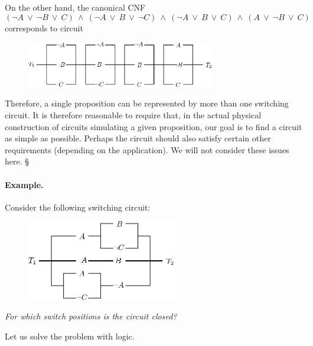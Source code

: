 \documentclass[11pt,paper=b5,footinclude,headinclude]{scrbook} %
\def\ali {{~\vee~}}
\def\inn {{~\wedge~}}
\def\kz{{\hfill{\S}}}%
\theoremstyle{remark}
\theoremstyle{definition} %
\theoremstyle{theorem} %
\begin{document}
On the other hand, the canonical CNF
$$(\neg A\ali\neg B \ali C) \inn (\neg A\ali B \ali \neg C)\inn
(\neg A\ali B \ali C) \inn (A\ali \neg B \ali C)$$
corresponds to circuit
\begin{figure}[h]
\begin{center}
\includegraphics[height=20mm]{vezje-KNO.eps}\label{fig:vezje-KNO}
\end{center}
\end{figure}

Therefore, a single proposition can be represented by more than one switching circuit.
It is therefore reasonable to require that, in the actual physical
construction of circuits simulating a given proposition, our goal is to find a
circuit as simple as possible. Perhaps the circuit should also satisfy certain other requirements
(depending on the application). We will not consider these issues here.
\kz

\bigskip
\paragraph{Example.}
Consider the following switching circuit:

\begin{figure}[h!]
\begin{center}
\includegraphics[height=35mm]{vezje2.eps}\label{fig:vezje2}
\end{center}
\end{figure}

{\em For which switch positions is the circuit closed?}

Let us solve the problem with logic.
\end{document}
